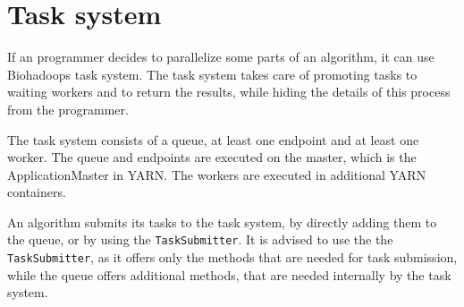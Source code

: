 %   
%   
% 
%   
% 
\section{Task system}
\label{chap:impl:task-system}
If an programmer decides to parallelize some parts of an algorithm, it can use Biohadoops task system. The task system takes care of promoting tasks to waiting workers and to return the results, while hiding the details of this process from the programmer.

The task system consists of a queue, at least one endpoint and at least one worker. The queue and endpoints are executed on the master, which is the ApplicationMaster in YARN. The workers are executed in additional YARN containers.

An algorithm submits its tasks to the task system, by directly adding them to the queue, or by using the \texttt{TaskSubmitter}. It is advised to use the the \texttt{TaskSubmitter}, as it offers only the methods that are needed for task submission, while the queue offers additional methods, that are needed internally by the task system.

